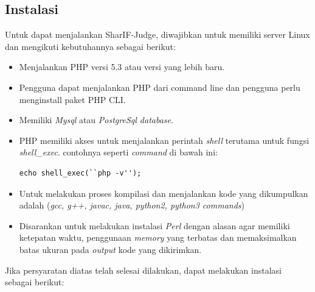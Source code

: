 \subsection{Instalasi}
\label{sec:Instalasi}
Untuk dapat menjalankan SharIF-Judge, diwajibkan untuk memiliki server Linux dan mengikuti kebutuhannya sebagai berikut:
\begin{itemize}
    \item Menjalankan PHP versi 5.3 atau versi yang lebih baru.
    \item Pengguna dapat menjalankan PHP dari command line  dan pengguna perlu menginstall paket PHP CLI.
    \item Memiliki \textit{Mysql} atau \textit{PostgreSql database}.
    \item PHP memiliki akses untuk menjalankan perintah \textit{shell} terutama untuk fungsi \textit{shell\_exec}. contohnya seperti \textit{command} di bawah ini: 
    
     \begin{lstlisting}[basicstyle=\ttfamily, frame=single,
    columns=fullflexible, breaklines=true, numbers=none]
echo shell_exec(``php -v'');
    \end{lstlisting}
    
    \item Untuk melakukan proses kompilasi dan menjalankan kode yang dikumpulkan adalah (\textit{gcc, g++, javac, java, python2, python3 commands})
    \item Disarankan untuk melakukan instalasi \textit{Perl} dengan alasan agar memiliki ketepatan waktu, penggunaan \textit{memory} yang terbatas dan memaksimalkan batas ukuran pada \textit{output} kode yang dikirimkan.
\end{itemize}
Jika persyaratan diatas telah selesai dilakukan, dapat melakukan instalasi sebagai berikut: 
